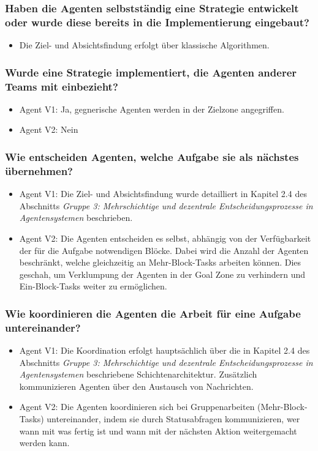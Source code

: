 \documentclass[runningheads]{llncs}
\newcommand{\refMain}{{\textit{Gruppe 3: Mehrschichtige und dezentrale Entscheidungsprozesse in Agentensystemen }}}
\begin{document}
	\subsubsection{Haben die Agenten selbstständig eine Strategie entwickelt oder wurde diese bereits in die Implementierung eingebaut?}
	\begin{itemize}
		\item Die Ziel- und Absichtsfindung erfolgt über klassische Algorithmen.
	\end{itemize}
	
	\subsubsection{Wurde eine Strategie implementiert, die Agenten anderer Teams mit einbezieht?}
	\begin{itemize}
		\item Agent V1: Ja, gegnerische Agenten werden in der Zielzone angegriffen.
		\item Agent V2: Nein
	\end{itemize}
	
	\subsubsection{Wie entscheiden Agenten, welche Aufgabe sie als nächstes übernehmen?}
	\begin{itemize}
		\item Agent V1: Die Ziel- und Absichtsfindung wurde detailliert in Kapitel 2.4 des Abschnitts \refMain beschrieben.
		\item Agent V2: Die Agenten entscheiden es selbst, abhängig von der Verfügbarkeit der für die Aufgabe notwendigen Blöcke. Dabei wird die Anzahl der Agenten beschränkt, welche gleichzeitig an Mehr-Block-Tasks arbeiten können. Dies geschah, um Verklumpung der Agenten in der Goal Zone zu verhindern und Ein-Block-Tasks weiter zu ermöglichen.
	\end{itemize}
	
	\subsubsection{Wie koordinieren die Agenten die Arbeit für eine Aufgabe untereinander?}
	\begin{itemize}
		\item Agent V1: Die Koordination erfolgt hauptsächlich über die in Kapitel 2.4 des Abschnitts \refMain beschriebene Schichtenarchitektur. Zusätzlich kommunizieren Agenten über den Austausch von Nachrichten.
		\item Agent V2: Die Agenten koordinieren sich bei Gruppenarbeiten (Mehr-Block-Tasks) untereinander, indem sie durch Statusabfragen kommunizieren, wer wann mit was fertig ist und wann mit der nächsten Aktion weitergemacht werden kann.
	\end{itemize}
	
\end{document}
